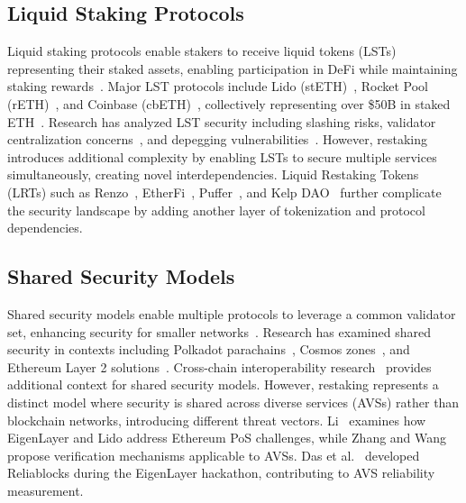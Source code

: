 \documentclass[runningheads]{llncs}
\begin{document}
\subsection{Liquid Staking Protocols}

Liquid staking protocols enable stakers to receive liquid tokens (LSTs) representing their staked assets, enabling participation in DeFi while maintaining staking rewards~\cite{zhang2022cross,li2021sovereign}. Major LST protocols include Lido (stETH)~\cite{lido2024}, Rocket Pool (rETH)~\cite{rocketpool2024}, and Coinbase (cbETH)~\cite{coinbase2024cbeth}, collectively representing over \$50B in staked ETH~\cite{ethereum2024staking,defillama2024}. Research has analyzed LST security including slashing risks, validator centralization concerns~\cite{chen2022rollup}, and depegging vulnerabilities~\cite{li2021sovereign,trailofbits2023staking}. However, restaking introduces additional complexity by enabling LSTs to secure multiple services simultaneously, creating novel interdependencies. Liquid Restaking Tokens (LRTs) such as Renzo~\cite{renzo2024}, EtherFi~\cite{etherfi2024}, Puffer~\cite{puffer2024}, and Kelp DAO~\cite{kelp2024} further complicate the security landscape by adding another layer of tokenization and protocol dependencies.

\subsection{Shared Security Models}

Shared security models enable multiple protocols to leverage a common validator set, enhancing security for smaller networks~\cite{wang2023survey,belchior2021survey}. Research has examined shared security in contexts including Polkadot parachains~\cite{wood2021polkadot}, Cosmos zones~\cite{kwon2019cosmos}, and Ethereum Layer 2 solutions~\cite{kalodner2018arbitrum,buterin2022danksharding}. Cross-chain interoperability research~\cite{herlihy2018atomic,zhang2021cross} provides additional context for shared security models. However, restaking represents a distinct model where security is shared across diverse services (AVSs) rather than blockchain networks, introducing different threat vectors. Li~\cite{li2024mitigating} examines how EigenLayer and Lido address Ethereum PoS challenges, while Zhang and Wang~\cite{zhang2024proof} propose verification mechanisms applicable to AVSs. Das et al.~\cite{das2025reliablocks} developed Reliablocks during the EigenLayer hackathon, contributing to AVS reliability measurement.
\end{document}
